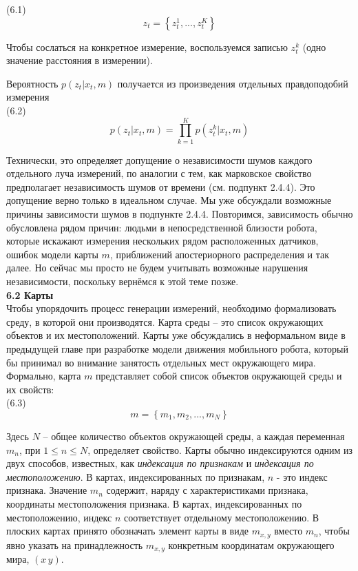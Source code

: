 \documentclass[10pt,a4paper]{article}
\begin{document}
(6.1)
$$z_t=\left\lbrace z_t^1,...,z_t^K\right\rbrace $$

Чтобы сослаться на конкретное измерение, воспользуемся записью $z^k_t$ (одно значение расстояния в измерении).

Вероятность $p(z_t | x_t, m)$ получается из произведения отдельных правдоподобий измерения\\

(6.2)
$$p(z_t|x_t,m)=\prod_{k=1}^K p(z_t^k|x_t,m)$$

Технически, это определяет допущение о независимости шумов каждого отдельного луча измерений, по аналогии с тем, как марковское свойство предполагает независимость шумов от времени (см. подпункт 2.4.4). Это допущение верно только в идеальном случае. Мы уже обсуждали возможные причины зависимости шумов в подпункте 2.4.4. Повторимся, зависимость обычно обусловлена рядом причин: людьми в непосредственной близости робота, которые искажают измерения нескольких рядом расположенных датчиков, ошибок модели карты $m$, приближений апостериорного распределения и так далее. Но сейчас мы просто не будем учитывать возможные нарушения независимости, поскольку вернёмся к этой теме позже.\\

\textbf{6.2 Карты }\\

Чтобы упорядочить процесс генерации измерений, необходимо формализовать среду, в которой они производятся.  Карта среды – это список окружающих объектов и их местоположений. Карты уже обсуждались в неформальном виде в предыдущей главе при разработке модели движения мобильного робота, который бы принимал во внимание занятость отдельных мест окружающего мира. Формально, карта $m$  представляет собой список объектов окружающей среды и их свойств:\\

(6.3)
$$m=\left\lbrace m_1,m_2,...,m_N\right\rbrace $$

Здесь $N$ – общее количество объектов окружающей среды, а каждая переменная $m_n$, при $1\leq n\leq N$, определяет свойство. Карты обычно индексируются одним из двух способов, известных, как \textit{индексация по признакам} и \textit{индексация по местоположению}. В картах, индексированных по признакам, $n$  - это индекс признака. Значение $m_n$ содержит, наряду с характеристиками признака, координаты местоположения признака. В картах, индексированных по местоположению, индекс $n$ соответствует отдельному местоположению. В плоских картах принято обозначать элемент карты в виде $m_{x,y}$ вместо $m_n$, чтобы явно указать на принадлежность $m_{x,y}$ конкретным координатам окружающего мира, $(x\,y)$.
\end{document}
